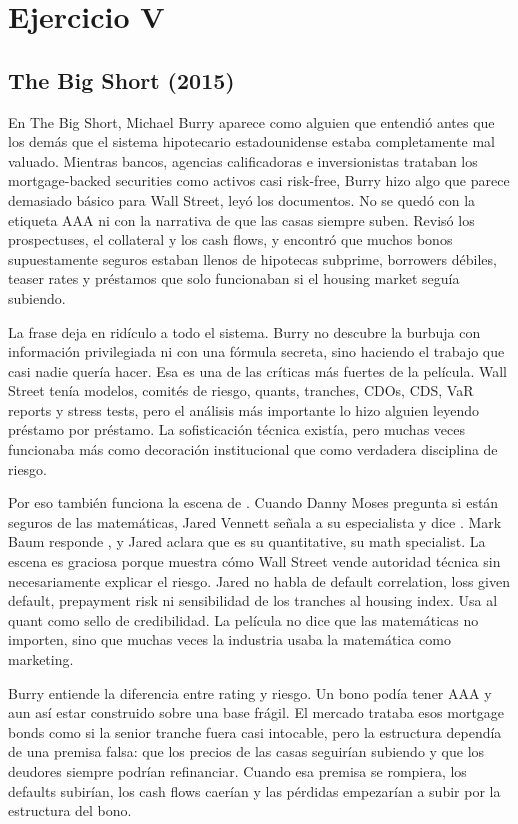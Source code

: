 \section{Ejercicio V}

\subsection{The Big Short (2015)}

En The Big Short, Michael Burry aparece como alguien que entendió antes que los demás que el sistema hipotecario estadounidense estaba completamente mal valuado. Mientras bancos, agencias calificadoras e inversionistas trataban los mortgage-backed securities como activos casi risk-free, Burry hizo algo que parece demasiado básico para Wall Street, leyó los documentos. No se quedó con la etiqueta AAA ni con la narrativa de que las casas siempre suben. Revisó los prospectuses, el collateral y los cash flows, y encontró que muchos bonos supuestamente seguros estaban llenos de hipotecas subprime, borrowers débiles, teaser rates y préstamos que solo funcionaban si el housing market seguía subiendo.

La frase  deja en ridículo a todo el sistema. Burry no descubre la burbuja con información privilegiada ni con una fórmula secreta, sino haciendo el trabajo que casi nadie quería hacer. Esa es una de las críticas más fuertes de la película. Wall Street tenía modelos, comités de riesgo, quants, tranches, CDOs, CDS, VaR reports y stress tests, pero el análisis más importante lo hizo alguien leyendo préstamo por préstamo. La sofisticación técnica existía, pero muchas veces funcionaba más como decoración institucional que como verdadera disciplina de riesgo.

Por eso también funciona la escena de . Cuando Danny Moses pregunta si están seguros de las matemáticas, Jared Vennett señala a su especialista y dice . Mark Baum responde , y Jared aclara que es su quantitative, su math specialist. La escena es graciosa porque muestra cómo Wall Street vende autoridad técnica sin necesariamente explicar el riesgo. Jared no habla de default correlation, loss given default, prepayment risk ni sensibilidad de los tranches al housing index. Usa al quant como sello de credibilidad. La película no dice que las matemáticas no importen, sino que muchas veces la industria usaba la matemática como marketing.

Burry entiende la diferencia entre rating y riesgo. Un bono podía tener AAA y aun así estar construido sobre una base frágil. El mercado trataba esos mortgage bonds como si la senior tranche fuera casi intocable, pero la estructura dependía de una premisa falsa: que los precios de las casas seguirían subiendo y que los deudores siempre podrían refinanciar. Cuando esa premisa se rompiera, los defaults subirían, los cash flows caerían y las pérdidas empezarían a subir por la estructura del bono.

